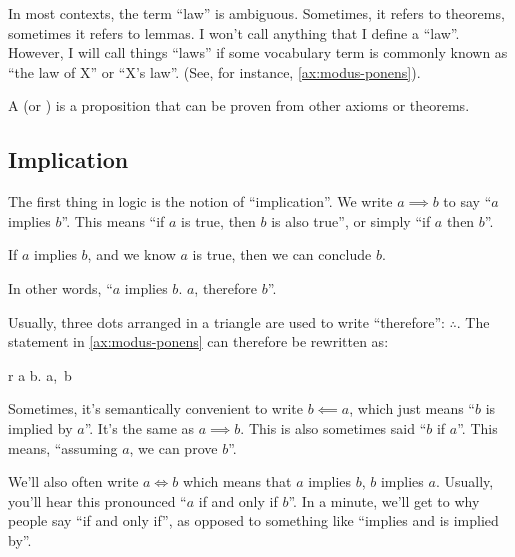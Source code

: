 \begin{remark}
  \label{r:law}
  In most contexts, the term ``law'' is ambiguous. Sometimes, it
  refers to theorems, sometimes it refers to lemmas. I won't call
  anything that I define a ``law''. However, I will call things
  ``laws'' if some vocabulary term is commonly known as ``the law of
  X'' or ``X's law''. (See, for instance, \cref{ax:modus-ponens}).
\end{remark}

\begin{definition}
  \label{def:theorem}
  A  (or ) is a proposition that can be
  proven from other axioms or theorems.
\end{definition}

\subsection{Implication}

The first thing in logic is the notion of ``implication''. We write
$a \implies b$ to say ``$a$ implies $b$''. This means ``if $a$ is
true, then $b$ is also true'', or simply ``if $a$ then $b$''.

\begin{axiom}
  \label{ax:modus-ponens}
  If $a$ implies $b$, and we know $a$ is true, then we can conclude
  $b$.

  In other words, ``$a$ implies $b$. $a$, therefore $b$''.
\end{axiom}

Usually, three dots arranged in a triangle are used to write
``therefore'': $\therefore$.  The statement in \cref{ax:modus-ponens}
can therefore be rewritten as:

\begin{alignmath}{r}
  a \implies b.\; a,\, \therefore b
\end{alignmath}

Sometimes, it's semantically convenient to write $b \impliedby a$,
which just means ``$b$ is implied by $a$''. It's the same as
$a \implies b$. This is also sometimes said ``$b$ if $a$''. This
means, ``assuming $a$, we can prove $b$''.

We'll also often write $a \iff b$ which means that $a$ implies $b$,
 $b$ implies $a$. Usually, you'll hear this pronounced ``$a$
if and only if $b$''. In a minute, we'll get to why people say ``if
and only if'', as opposed to something like ``implies and is implied
by''.

